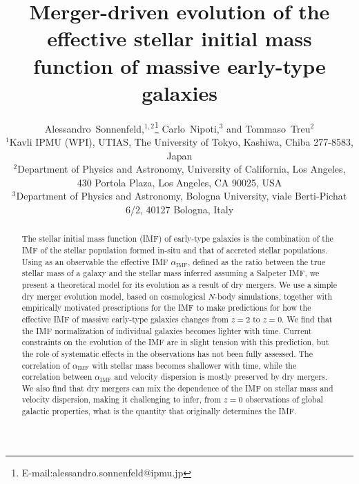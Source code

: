 \documentclass[usenatbib]{mnras}
\def\aimf{\alpha_{\mathrm{IMF}}}
\begin{document}
\title[Evolution of the stellar initial mass function of early-type galaxies]{Merger-driven evolution of the effective stellar initial mass function of massive early-type galaxies}
\author[Sonnenfeld et al.]{
Alessandro~Sonnenfeld,$^{1,2}$\thanks{E-mail:alessandro.sonnenfeld@ipmu.jp}
Carlo~Nipoti,$^{3}$
and Tommaso~Treu$^{2}$
\\
$^{1}$Kavli IPMU (WPI), UTIAS, The University of Tokyo, Kashiwa, Chiba 277-8583, Japan \\
$^{2}$Department of Physics and Astronomy, University of California, Los Angeles, 430 Portola Plaza, Los Angeles, CA 90025, USA \\
$^{3}$Department of Physics and Astronomy, Bologna University, viale Berti-Pichat 6/2, 40127 Bologna, Italy
}

\maketitle

\begin{abstract}
The stellar initial mass function (IMF) of early-type galaxies is the
combination of the IMF of the stellar population formed in-situ and
that of accreted stellar populations.  Using as an observable the
  effective IMF $\aimf$, defined as the ratio between the true stellar
  mass of a galaxy and the stellar mass inferred assuming a Salpeter
  IMF, we present a theoretical model for its evolution as a result
of dry mergers.  We use a simple dry merger evolution model, 
  based on cosmological $N$-body simulations, together with
empirically motivated prescriptions for the IMF to make predictions
for how the effective IMF of massive early-type galaxies changes from
$z=2$ to $z=0$.  We find that the IMF normalization of individual
galaxies becomes lighter with time.  Current constraints on the
evolution of the IMF are in slight tension with this prediction, but
the role of systematic effects in the observations has not been fully
assessed.  The correlation of $\aimf$ with stellar mass becomes
  shallower with time, while the correlation between $\aimf$ and
  velocity dispersion is mostly preserved by dry mergers.  We also
find that dry mergers can mix the dependence of the IMF on stellar
mass and velocity dispersion, making it challenging to infer,
  from $z=0$ observations of global galactic properties, what is the
  quantity that originally determines the IMF.
\end{abstract}
\end{document}

